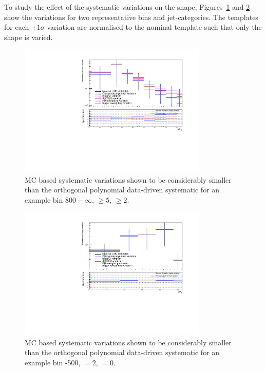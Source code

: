 To study the effect of the systematic variations on the \mht shape, 
Figures~\ref{fig:mcCompLow} and \ref{fig:mcCompHigh} show the variations for two representative \scalht 
bins and jet-categories. The templates for each $\pm 1 \sigma$ variation are normalised to the
nominal template such that only the \mht shape is varied.

\begin{figure}[h!]
  \centering
  \includegraphics[width=0.8\textwidth]{Figures/backgroundPrediction/mcComparison6fb/totalSMS-T1tttt_mGluino-1000_mLSP-100_25ns_mht_ge5j_ge3b_800.pdf}
  \caption{\label{fig:mcCompLow} MC based systematic variations shown to be considerably smaller 
  than the orthogonal polynomial data-driven systematic for an example bin \scalht $800-\infty$, \njet $\geq 5$, \nb $\geq 2$.}
\end{figure}
\begin{figure}[h!]
  \centering
  \includegraphics[width=0.8\textwidth]{Figures/backgroundPrediction/mcComparison6fb/totalSMS-T1tttt_mGluino-1000_mLSP-100_25ns_mht_eq2j_eq0b_400.pdf}
  \caption{\label{fig:mcCompHigh} MC based systematic variations shown to be considerably smaller 
  than the orthogonal polynomial data-driven systematic for an example bin -500, \njet $= 2$, \nb $= 0$.}
\end{figure}

